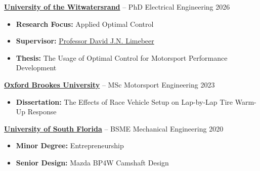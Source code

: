 \documentclass[12pt,letterpaper]{article} %
\begin{document}
\textbf{\href{https://www.wits.ac.za/eie/}{University of the Witwatersrand}} -- PhD Electrical Engineering \hfill 2026 \\
\vspace{-15pt}
\begin{itemize}[itemsep=-4pt]
    \item \textbf{Research Focus:} Applied Optimal Control
    \item \textbf{Supervisor:} \href{https://www.nrf.ac.za/about-us/nrf-awards/2022-2/a-rated-researchers-2022/professor-david-j-n-limebeer/}{Professor David J.N. Limebeer}
    \item \textbf{Thesis:} The Usage of Optimal Control for Motorsport Performance Development
\end{itemize}

\vspace{-5pt}
\textbf{\href{https://www.brookes.ac.uk/courses/postgraduate/motorsport-engineering-msc}{Oxford Brookes University}} -- MSc Motorsport Engineering \hfill 2023 \\
\vspace{-9pt}
\begin{itemize}[itemsep =-4pt]
    \item \textbf{Dissertation:} The Effects of Race Vehicle Setup on Lap-by-Lap Tire Warm-Up Response
\end{itemize}

\vspace{-5pt}
\textbf{\href{https://www.usf.edu/engineering/me/}{University of South Florida}} -- BSME Mechanical Engineering \hfill 2020 \\
\vspace{-9pt}
\begin{itemize}[itemsep = -4pt]
    \item \textbf{Minor Degree:} Entrepreneurship
    \item \textbf{Senior Design:} Mazda BP4W Camshaft Design
\end{itemize}

\vspace{-25pt} %

\end{document}
